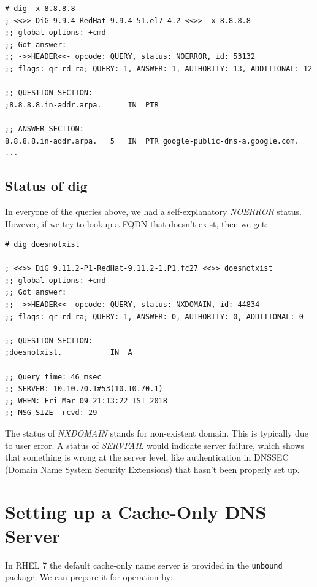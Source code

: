 \vspace{-15pt}
\begin{verbatim}
# dig -x 8.8.8.8
; <<>> DiG 9.9.4-RedHat-9.9.4-51.el7_4.2 <<>> -x 8.8.8.8
;; global options: +cmd
;; Got answer:
;; ->>HEADER<<- opcode: QUERY, status: NOERROR, id: 53132
;; flags: qr rd ra; QUERY: 1, ANSWER: 1, AUTHORITY: 13, ADDITIONAL: 12

;; QUESTION SECTION:
;8.8.8.8.in-addr.arpa.		IN	PTR

;; ANSWER SECTION:
8.8.8.8.in-addr.arpa.	5	IN	PTR	google-public-dns-a.google.com.
...
\end{verbatim}
\vspace{-10pt}	

\subsection{Status of dig}
In everyone of the queries above, we had a self-explanatory \textit{NOERROR} status. However, if we try to lookup a FQDN that doesn't exist, then we get:

\vspace{-15pt}
\begin{verbatim}
# dig doesnotxist

; <<>> DiG 9.11.2-P1-RedHat-9.11.2-1.P1.fc27 <<>> doesnotxist
;; global options: +cmd
;; Got answer:
;; ->>HEADER<<- opcode: QUERY, status: NXDOMAIN, id: 44834
;; flags: qr rd ra; QUERY: 1, ANSWER: 0, AUTHORITY: 0, ADDITIONAL: 0

;; QUESTION SECTION:
;doesnotxist.			IN	A

;; Query time: 46 msec
;; SERVER: 10.10.70.1#53(10.10.70.1)
;; WHEN: Fri Mar 09 21:13:22 IST 2018
;; MSG SIZE  rcvd: 29
\end{verbatim}
\vspace{-10pt}	

\noindent
The status of \textit{NXDOMAIN} stands for non-existent domain. This is typically due to user error. A status of \textit{SERVFAIL} would indicate server failure, which shows that something is wrong at the server level, like authentication in DNSSEC (Domain Name System Security Extensions) that hasn't been properly set up. 

	\section{Setting up a Cache-Only DNS Server}
In RHEL 7 the default cache-only name server is provided in the \verb|unbound| package. We can prepare it for operation by:

